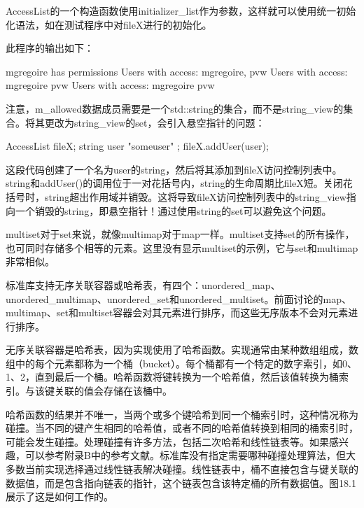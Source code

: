 AccessList的一个构造函数使用initializer\_list作为参数，这样就可以使用统一初始化语法，如在测试程序中对fileX进行的初始化。

此程序的输出如下：

\begin{shell}
mgregoire has permissions
Users with access: mgregoire, pvw
Users with access: mgregoire pvw
Users with access: mgregoire pvw
\end{shell}

注意，m\_allowed数据成员需要是一个std::string的集合，而不是string\_view的集合。将其更改为string\_view的set，会引入悬空指针的问题：

\begin{cpp}
AccessList fileX;
{
    string user { "someuser" };
    fileX.addUser(user);
}
\end{cpp}

这段代码创建了一个名为user的string，然后将其添加到fileX访问控制列表中。string和addUser()的调用位于一对花括号内，string的生命周期比fileX短。关闭花括号时，string超出作用域并销毁。这将导致fileX访问控制列表中的string\_view指向一个销毁的string，即悬空指针！通过使用string的set可以避免这个问题。


multiset对于set来说，就像multimap对于map一样。multiset支持set的所有操作，也可同时存储多个相等的元素。这里没有显示multiset的示例，它与set和multimap非常相似。


标准库支持无序关联容器或哈希表，有四个：unordered\_map、unordered\_multimap、unordered\_set和unordered\_multiset。前面讨论的map、multimap、set和multiset容器会对其元素进行排序，而这些无序版本不会对元素进行排序。


无序关联容器是哈希表，因为实现使用了哈希函数。实现通常由某种数组组成，数组中的每个元素都称为一个桶（bucket）。每个桶都有一个特定的数字索引，如0、1、2，直到最后一个桶。哈希函数将键转换为一个哈希值，然后该值转换为桶索引。与该键关联的值会存储在该桶中。

哈希函数的结果并不唯一，当两个或多个键哈希到同一个桶索引时，这种情况称为碰撞。当不同的键产生相同的哈希值，或者不同的哈希值转换到相同的桶索引时，可能会发生碰撞。处理碰撞有许多方法，包括二次哈希和线性链表等。如果感兴趣，可以参考附录B中的参考文献。标准库没有指定需要哪种碰撞处理算法，但大多数当前实现选择通过线性链表解决碰撞。线性链表中，桶不直接包含与键关联的数据值，而是包含指向链表的指针，这个链表包含该特定桶的所有数据值。图18.1展示了这是如何工作的。

